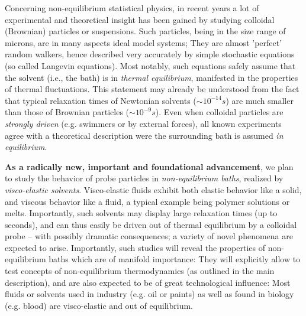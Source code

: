\begin{workpackage}[id=WPbrown,wphases=0-48,
  short=Brown. particles, %
  title=Brownian particles in nonequilibrium baths, %
  lead=USTUTT,
  USTUTTRM=36]

\begin{wpobjectives}

\end{wpobjectives}

\begin{wpdescription}

Concerning non-equilibrium statistical physics, in recent years a lot of experimental and
theoretical insight has been gained by studying colloidal (Brownian) particles or
suspensions. Such particles, being in the size range of microns, are in many aspects ideal
model systems; They are almost 'perfect' random walkers, hence described very accurately by
simple stochastic equations (so called Langevin equations). Most notably, such equations
safely assume that the solvent (i.e., the bath) is in {\it thermal equilibrium}, manifested
in the properties of thermal fluctuations. This statement may already be understood from the
fact that typical relaxation times of Newtonian solvents ($\sim 10^{-14} s$) are much
smaller than those of Brownian particles ($\sim 10^{-9} s$). Even when colloidal particles
are {\it strongly driven} (e.g. swimmers or by external forces), all known experiments agree
with a theoretical description were the surrounding bath is assumed {\it in equilibrium}.

{\bf As a radically new, important and foundational advancement}, we plan to study the
behavior of probe particles in {\it non-equilibrium baths}, realized by {\it visco-elastic
  solvents}. Visco-elastic fluids exhibit both elastic behavior like a solid, and viscous
behavior like a fluid, a typical example being polymer solutions or melts. Importantly, such
solvents may display large relaxation times (up to seconds), and can thus easily be driven
out of thermal equilibrium by a colloidal probe -- with possibly dramatic consequences; a
variety of novel phenomena are expected to arise. Importantly, such studies will reveal the
properties of non-equilibrium baths which are of manifold importance: They will explicitly
allow to test concepts of non-equilibrium thermodynamics (as outlined in the main
description), and are also expected to be of great technological influence: Most fluids or
solvents used in industry (e.g. oil or paints) as well as found in biology (e.g. blood) are
visco-elastic and out of equilibrium.


\end{wpdescription}
\end{workpackage}
